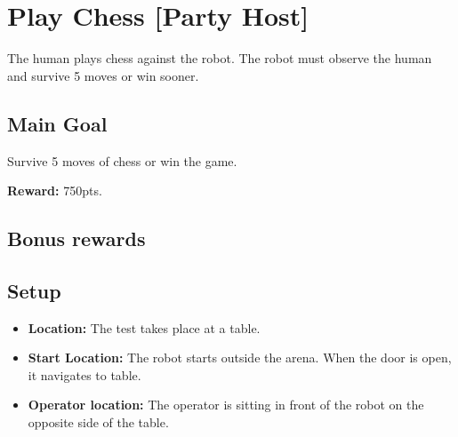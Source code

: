 \section{Play Chess [Party Host]}
\label{test:smoothie-chef}
The human plays chess against the robot.
The robot must observe the human and survive 5 moves or win sooner.



\subsection*{Main Goal}
Survive 5 moves of chess or win the game.

\noindent\textbf{Reward:} 750pts.


\subsection*{Bonus rewards}
\begin{enumerate}[nosep]
\end{enumerate}

\subsection*{Setup}
\begin{itemize}[nosep]
	\item \textbf{Location:} The test takes place at a table.

	\item \textbf{Start Location:} The robot starts outside the arena.
	When the door is open, it navigates to table.

	\item \textbf{Operator location:} The operator is sitting in front of the robot on the opposite side of the table.

\end{itemize}

